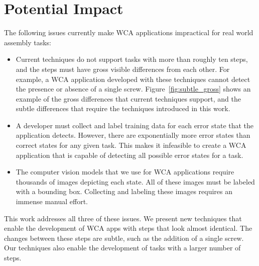 \section{Potential Impact}

The following issues currently make WCA applications impractical for real world
assembly tasks:
\begin{itemize}
\item Current techniques do not support tasks with more than roughly ten
    steps, and the
    steps must have gross visible differences from each other.
    For example, a WCA application developed with these techniques cannot detect
  the presence or absence of a single screw.
  Figure~{\ref{fig:subtle_gross}} shows an example of the gross differences that
  current techniques support, and the subtle differences that require the
  techniques introduced in this work.
\item A developer must collect and label training data for each error state
  that the application detects.
  However, there are exponentially more error states than correct
  states for any given task.
  This makes it infeasible to create a WCA application that is capable of
  detecting all possible error states for a task.
\item The computer vision models that we use for WCA applications require
  thousands of images depicting each state.
  All of these images must be labeled with a bounding box.
  Collecting and labeling these images requires an immense manual effort.
\end{itemize}

This work addresses all three of these issues.
We present new techniques that enable the development of WCA apps with steps
that look almost identical.
The changes between these steps are subtle, such as the addition of a single
screw.
Our techniques also enable the development of tasks with a larger number of
steps.

